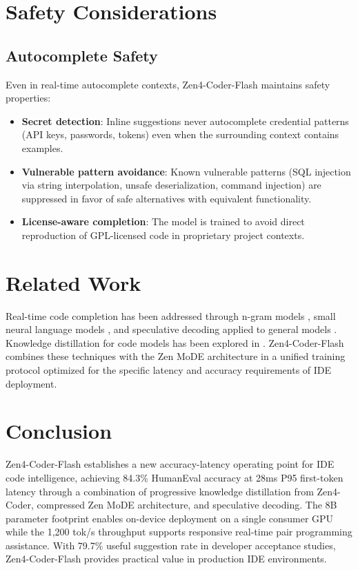 \documentclass[11pt,a4paper]{article}
\begin{document}
\section{Safety Considerations}

\subsection{Autocomplete Safety}

Even in real-time autocomplete contexts, Zen4-Coder-Flash maintains safety properties:

\begin{itemize}
  \item \textbf{Secret detection}: Inline suggestions never autocomplete credential patterns (API keys, passwords, tokens) even when the surrounding context contains examples.
  \item \textbf{Vulnerable pattern avoidance}: Known vulnerable patterns (SQL injection via string interpolation, unsafe deserialization, command injection) are suppressed in favor of safe alternatives with equivalent functionality.
  \item \textbf{License-aware completion}: The model is trained to avoid direct reproduction of GPL-licensed code in proprietary project contexts.
\end{itemize}

\section{Related Work}

Real-time code completion has been addressed through n-gram models \cite{ngram}, small neural language models \cite{codewhisperer}, and speculative decoding applied to general models \cite{speculative,specinfer}. Knowledge distillation for code models has been explored in \cite{codistil}. Zen4-Coder-Flash combines these techniques with the Zen MoDE architecture in a unified training protocol optimized for the specific latency and accuracy requirements of IDE deployment.

\section{Conclusion}

Zen4-Coder-Flash establishes a new accuracy-latency operating point for IDE code intelligence, achieving 84.3\% HumanEval accuracy at 28ms P95 first-token latency through a combination of progressive knowledge distillation from Zen4-Coder, compressed Zen MoDE architecture, and speculative decoding. The 8B parameter footprint enables on-device deployment on a single consumer GPU while the 1,200 tok/s throughput supports responsive real-time pair programming assistance. With 79.7\% useful suggestion rate in developer acceptance studies, Zen4-Coder-Flash provides practical value in production IDE environments.
\end{document}
